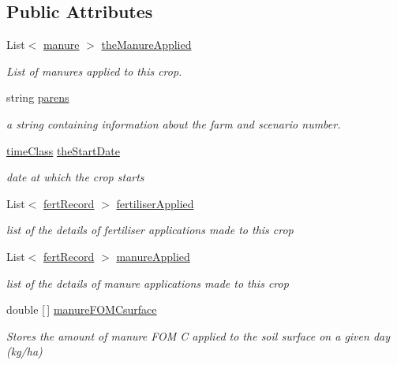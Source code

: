 \subsection*{Public Attributes}
\begin{DoxyCompactItemize}
\item 
List$<$ \mbox{\hyperlink{classmanure}{manure}} $>$ \mbox{\hyperlink{class_crop_class_a1bc000e4e6a0cf14b434274ef79df30c}{the\+Manure\+Applied}}
\begin{DoxyCompactList}\small\item\em List of manures applied to this crop. \end{DoxyCompactList}\item 
string \mbox{\hyperlink{class_crop_class_a157b2bf636da40932ea48a3249393492}{parens}}
\begin{DoxyCompactList}\small\item\em a string containing information about the farm and scenario number. \end{DoxyCompactList}\item 
\mbox{\hyperlink{classtime_class}{time\+Class}} \mbox{\hyperlink{class_crop_class_a41695be056fe34551f06f3e8e675d22d}{the\+Start\+Date}}
\begin{DoxyCompactList}\small\item\em date at which the crop starts \end{DoxyCompactList}\item 
List$<$ \mbox{\hyperlink{classfert_record}{fert\+Record}} $>$ \mbox{\hyperlink{class_crop_class_a63227de619d72a3ed18a15bdb1dde535}{fertiliser\+Applied}}
\begin{DoxyCompactList}\small\item\em list of the details of fertiliser applications made to this crop \end{DoxyCompactList}\item 
List$<$ \mbox{\hyperlink{classfert_record}{fert\+Record}} $>$ \mbox{\hyperlink{class_crop_class_af407b536de242900a53aa2defc117acc}{manure\+Applied}}
\begin{DoxyCompactList}\small\item\em list of the details of manure applications made to this crop \end{DoxyCompactList}\item 
double \mbox{[}$\,$\mbox{]} \mbox{\hyperlink{class_crop_class_a5d9c59d163042fa681af5bf114320b7e}{manure\+F\+O\+M\+Csurface}}
\begin{DoxyCompactList}\small\item\em Stores the amount of manure F\+OM C applied to the soil surface on a given day (kg/ha) \end{DoxyCompactList}\end{DoxyCompactItemize}


